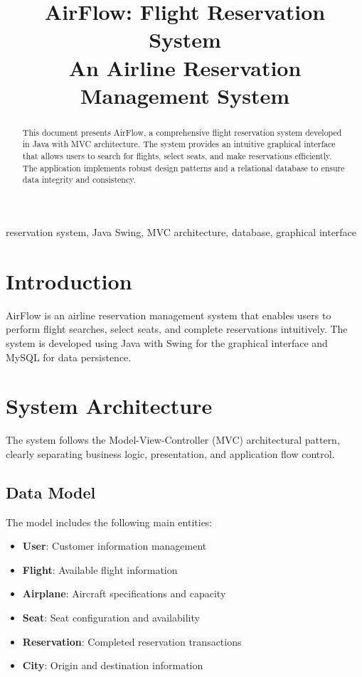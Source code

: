 \documentclass[conference]{IEEEtran}
\begin{document}
\title{AirFlow: Flight Reservation System\\
{\footnotesize An Airline Reservation Management System}}

\author{
}

\maketitle

\begin{abstract}
This document presents AirFlow, a comprehensive flight reservation system developed in Java with MVC architecture. The system provides an intuitive graphical interface that allows users to search for flights, select seats, and make reservations efficiently. The application implements robust design patterns and a relational database to ensure data integrity and consistency.
\end{abstract}

\begin{IEEEkeywords}
reservation system, Java Swing, MVC architecture, database, graphical interface
\end{IEEEkeywords}

\section{Introduction}
AirFlow is an airline reservation management system that enables users to perform flight searches, select seats, and complete reservations intuitively. The system is developed using Java with Swing for the graphical interface and MySQL for data persistence.

\section{System Architecture}
The system follows the Model-View-Controller (MVC) architectural pattern, clearly separating business logic, presentation, and application flow control.

\subsection{Data Model}
The model includes the following main entities:
\begin{itemize}
    \item \textbf{User}: Customer information management
    \item \textbf{Flight}: Available flight information
    \item \textbf{Airplane}: Aircraft specifications and capacity
    \item \textbf{Seat}: Seat configuration and availability
    \item \textbf{Reservation}: Completed reservation transactions
    \item \textbf{City}: Origin and destination information
\end{itemize}
\end{document}
